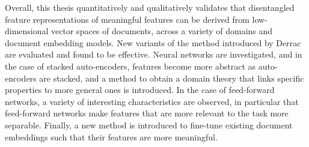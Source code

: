 \documentclass[a4paper,oneside,onecolumn,openright,12pt]{book}
\begin{document}
Overall, this thesis quantitatively and qualitatively validates  that disentangled feature representations of meaningful features can be derived from low-dimensional vector spaces of documents, across a variety of domains and document embedding models.  New variants of the method introduced by Derrac \cite{Derrac2015} are evaluated and found to be effective. Neural networks are investigated, and in the case of  stacked auto-encoders,  features become more abstract as auto-encoders are stacked, and a method to obtain a domain theory that links specific properties to more general ones is introduced. In the case of feed-forward networks, a variety of interesting characteristics are observed, in particular that feed-forward networks make features that are more relevant to the task more separable. Finally, a new method is introduced to fine-tune existing document embeddings such that their features are more meaningful. 









 




 
\end{document}
